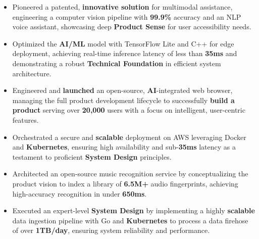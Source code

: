 \documentclass[a4paper]{extarticle}
\begin{document}
\n\begin{itemize}[noitemsep, topsep=0pt, leftmargin=*]\n    \item Pioneered a patented, \textbf{innovative solution} for multimodal assistance, engineering a computer vision pipeline with \textbf{99.9\%} accuracy and an NLP voice assistant, showcasing deep \textbf{Product Sense} for user accessibility needs.\n    \item Optimized the \textbf{AI/ML} model with TensorFlow Lite and C++ for edge deployment, achieving real-time inference latency of less than \textbf{35ms} and demonstrating a robust \textbf{Technical Foundation} in efficient system architecture.\n\end{itemize}\n\n{}\n\begin{itemize}[noitemsep, topsep=0pt, leftmargin=*]\n    \item Engineered and \textbf{launched} an open-source, \textbf{AI}-integrated web browser, managing the full product development lifecycle to successfully \textbf{build a product} serving over \textbf{20,000} users with a focus on intelligent, user-centric features.\n    \item Orchestrated a secure and \textbf{scalable} deployment on AWS leveraging Docker and \textbf{Kubernetes}, ensuring high availability and sub-\textbf{35ms} latency as a testament to proficient \textbf{System Design} principles.\n\end{itemize}\n\n{}\n\begin{itemize}[noitemsep, topsep=0pt, leftmargin=*]\n    \item Architected an open-source music recognition service by conceptualizing the product vision to index a library of \textbf{6.5M+} audio fingerprints, achieving high-accuracy recognition in under \textbf{650ms}.\n    \item Executed an expert-level \textbf{System Design} by implementing a highly \textbf{scalable} data ingestion pipeline with Go and \textbf{Kubernetes} to process a data firehose of over \textbf{1TB/day}, ensuring system reliability and performance.\n\end{itemize}\n{}\n\hspace{0pt}\n\EndAccSupp{}
\end{document}
